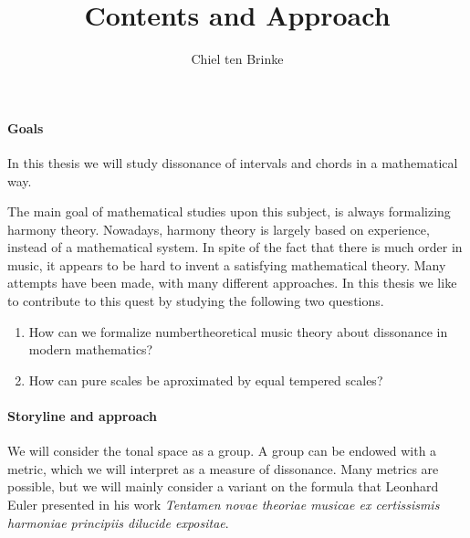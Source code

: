 \documentclass[a4paper]{article}
\title{Contents and Approach}
\author{Chiel ten Brinke}
\begin{document}
\maketitle

\paragraph{Goals}
In this thesis we will study dissonance of intervals and chords in a mathematical way.

The main goal of mathematical studies upon this subject, is always formalizing harmony theory.
Nowadays, harmony theory is largely based on experience, instead of a mathematical system.
In spite of the fact that there is much order in music, it appears to be hard to invent a satisfying mathematical theory.
Many attempts have been made, with many different approaches.
In this thesis we like to contribute to this quest by studying the following two questions.
\begin{enumerate}
    \item How can we formalize numbertheoretical music theory about dissonance in modern mathematics?
    \item How can pure scales be aproximated by equal tempered scales?
\end{enumerate}

\paragraph{Storyline and approach} 

We will consider the tonal space as a group.
A group can be endowed with a metric, which we will interpret as a measure of dissonance.
Many metrics are possible, but we will mainly consider a variant on the formula that Leonhard Euler presented in his work \emph{Tentamen novae theoriae musicae ex certissismis harmoniae principiis dilucide expositae}.
\end{document}
